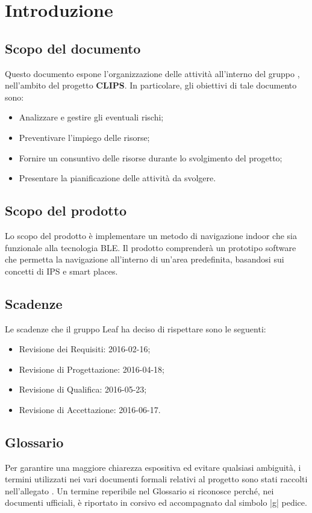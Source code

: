 \documentclass[../PianoProgetto.tex]{subfiles}
\begin{document}
\section{Introduzione}
	\subsection{Scopo del documento}
	Questo documento espone l'organizzazione delle attività all'interno del gruppo \leaf, nell'ambito del progetto \textbf{CLIPS}.
In particolare, gli obiettivi di tale documento sono:
	\begin{itemize}
	\item Analizzare e gestire gli eventuali rischi;
	\item Preventivare l'impiego delle risorse;
	\item Fornire un consuntivo delle risorse durante lo svolgimento del progetto;
	\item Presentare la pianificazione delle attività da svolgere.
	\end{itemize}
	
	\subsection{Scopo del prodotto}
	Lo scopo del prodotto è implementare un metodo di navigazione indoor che sia funzionale alla tecnologia BLE.
	Il prodotto comprenderà un prototipo software che permetta la navigazione all’interno di un’area predefinita, basandosi sui concetti di IPS e smart places.

	\subsection{Scadenze}
		Le scadenze che il gruppo Leaf  ha deciso di rispettare sono le seguenti:
		\begin{itemize}
		\item Revisione dei Requisiti: 2016-02-16;
		\item Revisione di Progettazione: 2016-04-18;
		\item Revisione di Qualifica: 2016-05-23;
		\item Revisione di Accettazione: 2016-06-17.
		\end{itemize}


	\subsection{Glossario}
		Per garantire una maggiore chiarezza espositiva ed evitare qualsiasi ambiguità, i termini utilizzati nei vari documenti formali relativi al progetto sono stati raccolti nell’allegato \glossariov. 
		Un termine reperibile nel Glossario si riconosce perché, nei documenti ufficiali, è riportato in corsivo ed accompagnato dal simbolo |g| pedice.
\end{document}
